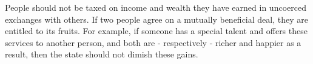 People should not be taxed on income and wealth they have earned in uncoerced exchanges with others. If two people agree on a mutually beneficial deal, they are entitled to its fruits. For example, if someone has a special talent and offers these services to another person, and both are - respectively - richer and happier as a result, then the state should not dimish these gains.
